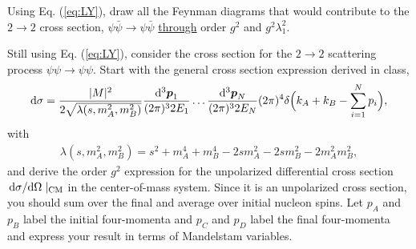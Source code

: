 {\begin{parts}
\item Using Eq. (\ref{eq:LY}), draw all the Feynman diagrams that would contribute to the $2 \rightarrow 2$ cross section, $\psi \bar{\psi} \rightarrow \psi \bar{\psi}$ \underline{through} order $g^2$ and $g^2 \lambda_1^2$.

\item Still using Eq. (\ref{eq:LY}), consider the cross section for the $2 \rightarrow 2$ scattering process $\psi \psi \rightarrow \psi \psi$.
    Start with the general cross section expression derived in class,
    \begin{align}
        \dd{\sigma} = \frac{|M|^2}{2 \sqrt{\lambda(s,m_{A}^2,m_{B}^2)}} \frac{\dd[3]{\vb*{p}_{1}}}{(2 \pi)^3 2 E_{1}} \ldots \frac{\dd[3]{\vb*{p}_{N}}}{(2 \pi)^3 2 E_{N}} (2 \pi)^{4} \delta\Big( k_{A} + k_{B} - \sum_{i=1}^{N} p_{i} \Big)
    ,\end{align}
    with
    \begin{align}
        \lambda(s,m_{A}^2,m_{B}^2) = s^2 + m_{A}^{4} + m_{B}^{4} - 2 s m_{A}^2 - 2 s m_{B}^2 - 2 m_{A}^2 m_{B}^2
    ,\end{align}
    and derive the order $g^2$ expression for the unpolarized differential cross section $\dv*{\sigma}{\Omega}|_{\rm CM}$ in the center-of-mass system.
    Since it is an unpolarized cross section, you should sum over the final and average over initial nucleon spins.
    Let $p_{A}$ and $p_{B}$ label the initial four-momenta and $p_{C}$ and $p_{D}$ label the final four-momenta and express your result in terms of Mandelstam variables.
    
\end{parts}

}

